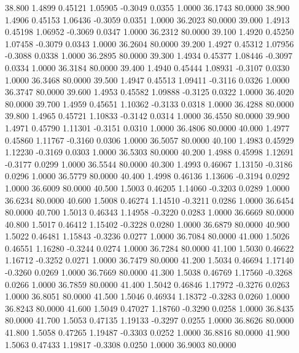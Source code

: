   38.800   1.4899   0.45121   1.05905  -0.3049   0.0355   1.0000  36.1743  80.0000
  38.900   1.4906   0.45153   1.06436  -0.3059   0.0351   1.0000  36.2023  80.0000
  39.000   1.4913   0.45198   1.06952  -0.3069   0.0347   1.0000  36.2312  80.0000
  39.100   1.4920   0.45250   1.07458  -0.3079   0.0343   1.0000  36.2604  80.0000
  39.200   1.4927   0.45312   1.07956  -0.3088   0.0338   1.0000  36.2895  80.0000
  39.300   1.4934   0.45377   1.08446  -0.3097   0.0334   1.0000  36.3184  80.0000
  39.400   1.4940   0.45444   1.08931  -0.3107   0.0330   1.0000  36.3468  80.0000
  39.500   1.4947   0.45513   1.09411  -0.3116   0.0326   1.0000  36.3747  80.0000
  39.600   1.4953   0.45582   1.09888  -0.3125   0.0322   1.0000  36.4020  80.0000
  39.700   1.4959   0.45651   1.10362  -0.3133   0.0318   1.0000  36.4288  80.0000
  39.800   1.4965   0.45721   1.10833  -0.3142   0.0314   1.0000  36.4550  80.0000
  39.900   1.4971   0.45790   1.11301  -0.3151   0.0310   1.0000  36.4806  80.0000
  40.000   1.4977   0.45860   1.11767  -0.3160   0.0306   1.0000  36.5057  80.0000
  40.100   1.4983   0.45929   1.12230  -0.3169   0.0303   1.0000  36.5303  80.0000
  40.200   1.4988   0.45998   1.12691  -0.3177   0.0299   1.0000  36.5544  80.0000
  40.300   1.4993   0.46067   1.13150  -0.3186   0.0296   1.0000  36.5779  80.0000
  40.400   1.4998   0.46136   1.13606  -0.3194   0.0292   1.0000  36.6009  80.0000
  40.500   1.5003   0.46205   1.14060  -0.3203   0.0289   1.0000  36.6234  80.0000
  40.600   1.5008   0.46274   1.14510  -0.3211   0.0286   1.0000  36.6454  80.0000
  40.700   1.5013   0.46343   1.14958  -0.3220   0.0283   1.0000  36.6669  80.0000
  40.800   1.5017   0.46412   1.15402  -0.3228   0.0280   1.0000  36.6879  80.0000
  40.900   1.5022   0.46481   1.15843  -0.3236   0.0277   1.0000  36.7084  80.0000
  41.000   1.5026   0.46551   1.16280  -0.3244   0.0274   1.0000  36.7284  80.0000
  41.100   1.5030   0.46622   1.16712  -0.3252   0.0271   1.0000  36.7479  80.0000
  41.200   1.5034   0.46694   1.17140  -0.3260   0.0269   1.0000  36.7669  80.0000
  41.300   1.5038   0.46769   1.17560  -0.3268   0.0266   1.0000  36.7859  80.0000
  41.400   1.5042   0.46846   1.17972  -0.3276   0.0263   1.0000  36.8051  80.0000
  41.500   1.5046   0.46934   1.18372  -0.3283   0.0260   1.0000  36.8243  80.0000
  41.600   1.5049   0.47027   1.18760  -0.3290   0.0258   1.0000  36.8435  80.0000
  41.700   1.5053   0.47135   1.19133  -0.3297   0.0255   1.0000  36.8626  80.0000
  41.800   1.5058   0.47265   1.19487  -0.3303   0.0252   1.0000  36.8816  80.0000
  41.900   1.5063   0.47433   1.19817  -0.3308   0.0250   1.0000  36.9003  80.0000

